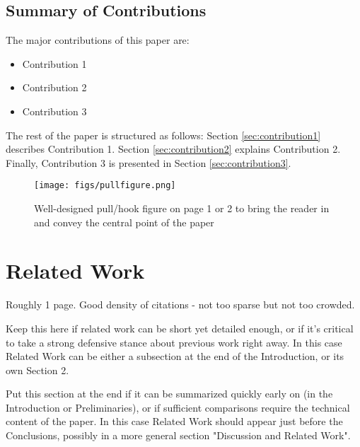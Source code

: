 \documentclass{article}
\begin{document}
\subsection{Summary of Contributions}
\label{contributionsummary}

The major contributions of this paper are:

\begin{itemize}
    \item Contribution 1
    \item Contribution 2
    \item Contribution 3
\end{itemize}

The rest of the paper is structured as follows: Section \ref{sec:contribution1} describes Contribution 1. Section \ref{sec:contribution2} explains Contribution 2. Finally, Contribution 3 is presented in Section \ref{sec:contribution3}.

\begin{figure}[h]
\centering
\begin{minipage}{0.55\linewidth}
    \centering
    \texttt{[image: figs/pullfigure.png]} 
\end{minipage}
\caption{Well-designed pull/hook figure on page 1 or 2 to bring the reader in and convey the central point of the paper}
\label{fig:system}
\end{figure}


\section{Related Work}
\label{related}

Roughly 1 page. Good density of citations - not too sparse but not too crowded.

Keep this here if related work can be short yet detailed enough, or if it's critical to take a strong defensive stance about previous work right away. In this case Related Work can be either a subsection at the end of the Introduction, or its own Section 2.

Put this section at the end if it can be summarized quickly early on (in the Introduction or Preliminaries), or if sufficient comparisons require the technical content of the paper. In this case Related Work should appear just before the Conclusions, possibly in a more general section "Discussion and Related Work".
\end{document}
